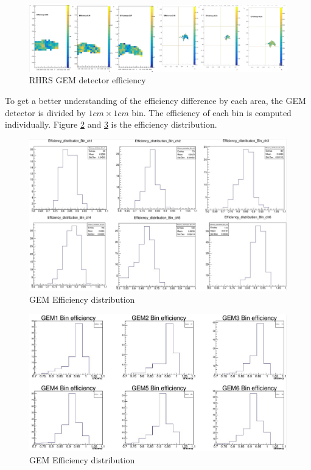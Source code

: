 \begin{figure}[!htbp]
    \centering
    \includegraphics[width=\textwidth]{images/chap5/rhrs_efficiency_2d.png}
    \caption{RHRS GEM detector efficiency}
    \label{fig:rhrs_efficiency_2d}
\end{figure}

To get a better understanding of the efficiency difference by each area, the GEM detector is divided by $1cm \times 1cm$ bin. The efficiency of each bin is computed individually. Figure \ref{fig:lhrs_gem_bin_efficiency} and \ref{fig:rhrs_gem_bin_efficiency} is the efficiency distribution.  
\begin{figure}[!htbp]
    \centering
    \includegraphics[width=\textwidth]{images/chap5/lhrs_gem_bin_efficiency.png}
    \caption{GEM Efficiency distribution}
    \label{fig:lhrs_gem_bin_efficiency}
\end{figure}

\begin{figure}[!htbp]
    \centering
    \includegraphics[width=\textwidth]{images/chap5/rhrs_gem_bin_efficiency.png}
    \caption{GEM Efficiency distribution}
    \label{fig:rhrs_gem_bin_efficiency}
\end{figure}

